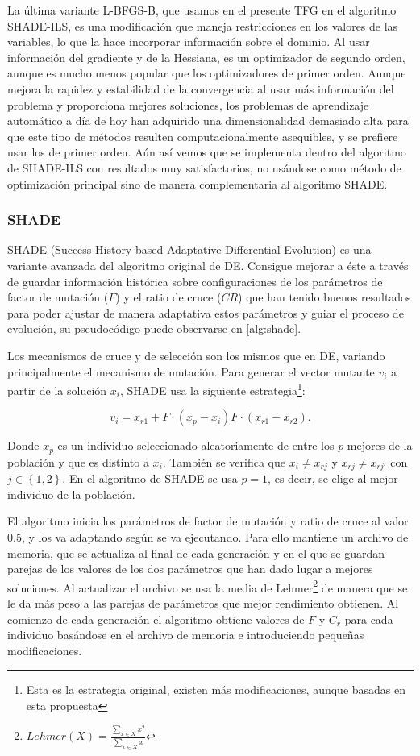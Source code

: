 La última variante L-BFGS-B, que usamos en el presente TFG en el algoritmo SHADE-ILS, es una modificación que maneja restricciones en los valores de las variables, lo que la hace incorporar información sobre el dominio. Al usar información del gradiente y de la Hessiana, es un optimizador de segundo orden, aunque es mucho menos popular que los optimizadores de primer orden. Aunque mejora la rapidez y estabilidad de la convergencia al usar más información del problema y proporciona mejores soluciones, los problemas de aprendizaje automático a día de hoy han adquirido una dimensionalidad demasiado alta para que este tipo de métodos resulten computacionalmente asequibles, y se prefiere usar los de primer orden. Aún así vemos que se implementa dentro del algoritmo de SHADE-ILS con resultados muy satisfactorios, no usándose como método de optimización principal sino de manera complementaria al algoritmo SHADE.


\subsubsection{SHADE}

SHADE (Success-History based Adaptative Differential Evolution) \cite{shade} es una variante avanzada del algoritmo original de DE. Consigue mejorar a éste a través de guardar información histórica sobre configuraciones de los parámetros de factor de mutación ($F$) y el ratio de cruce ($CR$) que han tenido buenos resultados para poder ajustar de manera adaptativa estos parámetros y guiar el proceso de evolución, su pseudocódigo puede observarse en \ref{alg:shade}. 

Los mecanismos de cruce y de selección son los mismos que en DE, variando principalmente el mecanismo de mutación. Para generar el vector mutante $v_i$ a partir de la solución $x_i$, SHADE usa la siguiente estrategia\footnote{Esta es la estrategia original, existen más modificaciones, aunque basadas en esta propuesta}:

$$v_i = x_{r1} + F \cdot (x_p - x_i) F \cdot (x_{r1} - x_{r2}).$$

Donde $x_p$ es un individuo seleccionado aleatoriamente de entre los $p$ mejores de la población y que es distinto a $x_i$. También se verifica que $x_i  \neq x_{rj}$ y $x_{rj} \neq x_{rj'}$ con $j \in \left \{ 1,2 \right \}$. En el algoritmo de SHADE se usa $p=1$, es decir, se elige al mejor individuo de la población.

El algoritmo inicia los parámetros de factor de mutación y ratio de cruce al valor 0.5, y los va adaptando según se va ejecutando. Para ello mantiene un archivo de memoria, que se actualiza al final de cada generación y en el que se guardan parejas de los valores de los dos parámetros que han dado lugar a mejores soluciones. Al actualizar el archivo se usa la media de Lehmer\footnote{$Lehmer(X) = \frac{\sum_{x\in X} x^2}{\sum_{x\in X} x}$}  de manera que se le da más peso a las parejas de parámetros que mejor rendimiento obtienen. Al comienzo de cada generación el algoritmo obtiene valores de $F$ y $C_r$ para cada individuo basándose en el archivo de memoria e introduciendo pequeñas modificaciones.



